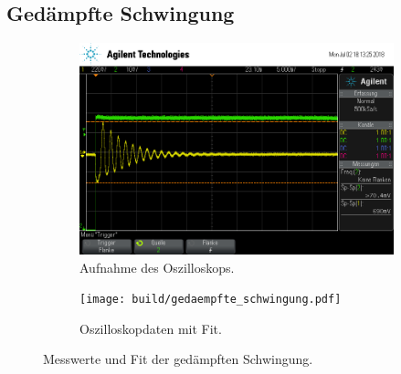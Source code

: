 \subsection{Ged\"ampfte Schwingung}

\begin{figure}[ht]
  \centering
  \begin{subfigure}{\textwidth}
    \centering
    \includegraphics[height=0.3\textheight]{data/scope_275.png}
    \caption{Aufnahme des Oszilloskops.}%
    \label{fig:gedaempft_oszilloskop}
  \end{subfigure}
  \begin{subfigure}{\textwidth}
    \centering
    \texttt{[image: build/gedaempfte\_schwingung.pdf]}
    \caption{Oszilloskopdaten mit Fit.}%
    \label{fig:gedaempft_fit}
  \end{subfigure}
  \caption{Messwerte und Fit der gedämpften Schwingung.}%
  \label{fig:gedaempft}
\end{figure}

